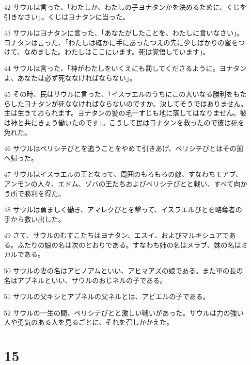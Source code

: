 \par 42 サウルは言った、「わたしか、わたしの子ヨナタンかを決めるために、くじを引きなさい」。くじはヨナタンに当った。
\par 43 サウルはヨナタンに言った、「あなたがしたことを、わたしに言いなさい」。ヨナタンは言った、「わたしは確かに手にあったつえの先に少しばかりの蜜をつけて、なめました。わたしはここにいます。死は覚悟しています」。
\par 44 サウルは言った、「神がわたしをいくえにも罰してくださるように。ヨナタンよ、あなたは必ず死ななければならない」。
\par 45 その時、民はサウルに言った、「イスラエルのうちにこの大いなる勝利をもたらしたヨナタンが死ななければならないのですか。決してそうではありません。主は生きておられます。ヨナタンの髪の毛一すじも地に落してはなりません。彼は神と共にきょう働いたのです」。こうして民はヨナタンを救ったので彼は死を免れた。
\par 46 サウルはペリシテびとを追うことをやめて引きあげ、ペリシテびとはその国へ帰った。
\par 47 サウルはイスラエルの王となって、周囲のもろもろの敵、すなわちモアブ、アンモンの人々、エドム、ゾバの王たちおよびペリシテびとと戦い、すべて向かう所で勝利を得た。
\par 48 サウルは勇ましく働き、アマレクびとを撃って、イスラエルびとを略奪者の手から救い出した。
\par 49 さて、サウルのむすこたちはヨナタン、エスイ、およびマルキシュアである。ふたりの娘の名は次のとおりである。すなわち姉の名はメラブ、妹の名はミカルである。
\par 50 サウルの妻の名はアヒノアムといい、アヒマアズの娘である。また軍の長の名はアブネルといい、サウルのおじネルの子である。
\par 51 サウルの父キシとアブネルの父ネルとは、アビエルの子である。
\par 52 サウルの一生の間、ペリシテびとと激しい戦いがあった。サウルは力の強い人や勇気のある人を見るごとに、それを召しかかえた。

\chapter{15}

